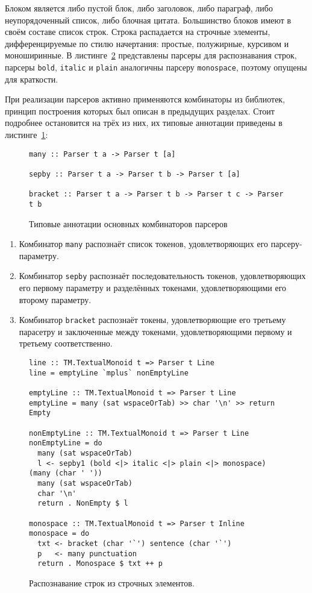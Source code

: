 Блоком является либо пустой блок, либо заголовок, либо параграф, либо неупорядоченный список, либо блочная цитата. Большинство блоков имеют в своём составе список строк. Строка распадается на строчные элементы, дифференцируемые по стилю начертания: простые, полужирные, курсивом и моноширинные. В листинге~\ref{listing:MarkdownInline} представлены парсеры для распознавания строк, парсеры \lstinline{bold}, \lstinline{italic} и \lstinline{plain} аналогичны парсеру \lstinline{monospace}, поэтому опущены для краткости.

При реализации парсеров активно применяются комбинаторы из библиотек, принцип построения которых был описан в предыдущих разделах. Стоит подробнее остановится на трёх из них, их типовые аннотации приведены в листинге~\ref{listing:ParserCombinators}:

\begin{figure}[h]
\begin{lstlisting}
many :: Parser t a -> Parser t [a]

sepby :: Parser t a -> Parser t b -> Parser t [a] 

bracket :: Parser t a -> Parser t b -> Parser t c -> Parser t b
\end{lstlisting}
\caption{Типовые аннотации основных комбинаторов парсеров}
\label{listing:ParserCombinators}
\end{figure} 

\begin{enumerate}
  \item Комбинатор \lstinline{many} распознаёт список токенов, удовлетворяющих его парсеру-параметру.
  \item Комбинатор \lstinline{sepby} распознаёт последовательность токенов, удовлетворяющих его первому параметру и разделённых токенами, удовлетворяющими его второму параметру.
  \item Комбинатор \lstinline{bracket} распознаёт токены, удовлетворяющие его третьему парасетру и заключенные между токенами, удовлетворяющими первому и третьему соответственно.  
\end{enumerate}

\begin{figure}[t]
\begin{lstlisting}
line :: TM.TextualMonoid t => Parser t Line
line = emptyLine `mplus` nonEmptyLine

emptyLine :: TM.TextualMonoid t => Parser t Line
emptyLine = many (sat wspaceOrTab) >> char '\n' >> return Empty

nonEmptyLine :: TM.TextualMonoid t => Parser t Line
nonEmptyLine = do
  many (sat wspaceOrTab)
  l <- sepby1 (bold <|> italic <|> plain <|> monospace) (many (char ' '))
  many (sat wspaceOrTab)
  char '\n'
  return . NonEmpty $ l

monospace :: TM.TextualMonoid t => Parser t Inline
monospace = do
  txt <- bracket (char '`') sentence (char '`')
  p   <- many punctuation
  return . Monospace $ txt ++ p
\end{lstlisting}
\caption{Распознавание строк из строчных элементов.}
\label{listing:MarkdownInline}
\end{figure} 

